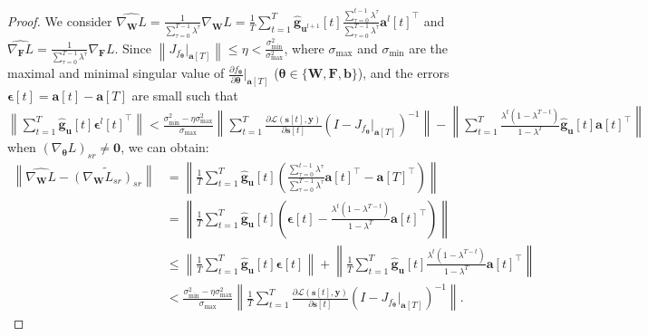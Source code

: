\documentclass{article}
\begin{document}
\begin{proof}
We consider $\widehat{\nabla_{\mathbf{W}}L} = \frac{1}{\sum_{\tau=0}^{T-1}\lambda^\tau}\nabla_{\mathbf{W}}L = \frac{1}{T}\sum_{t=1}^T \hat{\mathbf{g}}_{\mathbf{u}^{l+1}}[t] \frac{\sum_{\tau=0}^{t-1}\lambda^\tau}{\sum_{\tau=0}^{T-1}\lambda^\tau}{\mathbf{a}^l[t]}^\top$ and $\widehat{\nabla_{\mathbf{F}}L} = \frac{1}{\sum_{\tau=0}^{T-1}\lambda^\tau}\nabla_{\mathbf{F}}L$. Since $\left\lVert J_{f_{\bm{\theta}}}\vert_{\mathbf{a}[T]} \right\rVert \leq \eta < \frac{\sigma_{\text{min}}^2}{\sigma_{\text{max}}^2}$, where $\sigma_{\text{max}}$ and $\sigma_{\text{min}}$ are the maximal and minimal singular value of $\frac{\partial f_{\bm{\theta}}}{\partial \bm{\theta}}\vert_{\mathbf{a}[T]}$ ($\bm{\theta}\in \{\mathbf{W}, \mathbf{F}, \mathbf{b}\}$), and the errors $\bm{\epsilon}[t]=\mathbf{a}[t]-\mathbf{a}[T]$ are small such that $\left\lVert \sum_{t=1}^T \hat{\mathbf{g}}_{\mathbf{u}}[t] {\bm{\epsilon}^l[t]}^\top  \right\rVert < \frac{\sigma_{\text{min}}^2-\eta \sigma_{\text{max}}^2}{\sigma_{\text{max}}}\left\lVert \sum_{t=1}^T \frac{\partial \mathcal{L}(\mathbf{s}[t], \mathbf{y})}{\partial \mathbf{s}[t]} \left(I-J_{f_{\bm{\theta}}}\vert_{\mathbf{a}[T]}\right)^{-1} \right\rVert - \left\lVert \sum_{t=1}^T \frac{\lambda^t(1-\lambda^{T-t})}{1-\lambda^T}\hat{\mathbf{g}}_{\mathbf{u}}[t] {\mathbf{a}[t]}^\top  \right\rVert$ when $\left(\nabla_{\bm{\theta}}L\right)_{sr}\neq\mathbf{0}$, we can obtain: 
\begin{equation}
\begin{aligned}
    \left\lVert \widehat{\nabla_{\mathbf{W}}L} - \widetilde{\left(\nabla_{\mathbf{W}}L_{sr}\right)_{sr}} \right\rVert &= \left\lVert \frac{1}{T}\sum_{t=1}^T \hat{\mathbf{g}}_{\mathbf{u}}[t] \left(\frac{\sum_{\tau=0}^{t-1}\lambda^\tau}{\sum_{\tau=0}^{T-1}\lambda^\tau}{\mathbf{a}[t]}^\top - {\mathbf{a}[T]}^\top\right) \right\rVert\\
    &= \left\lVert \frac{1}{T}\sum_{t=1}^T \hat{\mathbf{g}}_{\mathbf{u}}[t] \left(\bm{\epsilon}[t] - \frac{\lambda^t(1-\lambda^{T-t})}{1-\lambda^T}{\mathbf{a}[t]}^\top\right) \right\rVert\\
    &\leq \left\lVert \frac{1}{T}\sum_{t=1}^T \hat{\mathbf{g}}_{\mathbf{u}}[t] \bm{\epsilon}[t] \right\rVert + \left\lVert \frac{1}{T}\sum_{t=1}^T \hat{\mathbf{g}}_{\mathbf{u}}[t]\frac{\lambda^t(1-\lambda^{T-t})}{1-\lambda^T}{\mathbf{a}[t]}^\top \right\rVert\\
    &< \frac{\sigma_{\text{min}}^2-\eta \sigma_{\text{max}}^2}{\sigma_{\text{max}}}\left\lVert \frac{1}{T}\sum_{t=1}^T \frac{\partial \mathcal{L}(\mathbf{s}[t], \mathbf{y})}{\partial \mathbf{s}[t]} \left(I-J_{f_{\bm{\theta}}}\vert_{\mathbf{a}[T]}\right)^{-1} \right\rVert.
\end{aligned}
\end{equation}


\end{proof}
\end{document}
